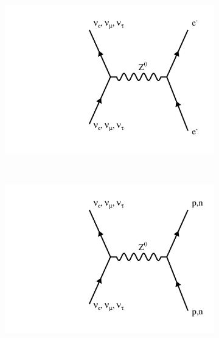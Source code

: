 \begin{figure}[t]
\centering
\begin{subfigure}[b]{0.3\textwidth}
                \centering
                \includegraphics[width=\textwidth]{figures/feynman/ncElec.pdf}
                \caption{}
                 \label{ncElec}
        \end{subfigure}
        ~
\begin{subfigure}[b]{0.3\textwidth}
                \centering
                \includegraphics[width=\textwidth]{figures/feynman/ncHad.pdf}
                \caption{}
                 \label{ncHad}
        \end{subfigure}      
        ~
        \begin{subfigure}[b]{0.3\textwidth}
                \centering

\end{subfigure}
\end{figure}
